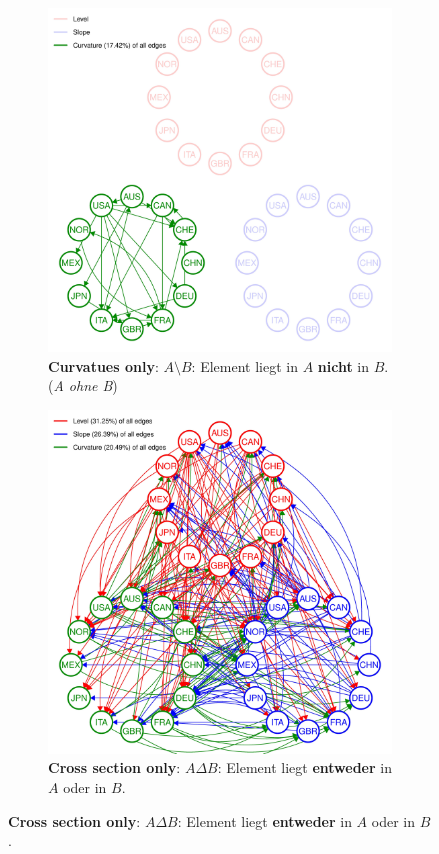 \documentclass{article}
\begin{document}
\begin{figure}[H]
  \medskip

  \begin{subfigure}[t]{.4\textwidth}
    \centering
    \includegraphics[width=\linewidth]{All_plot_onlycurv_2004-07-01_2019-12-31_0.01-page-001}
    \caption{\textbf{Curvatues only}: $A \setminus B$: Element liegt in $A$ \textbf{nicht} in $B$. (\textit{A ohne B})}
  \end{subfigure}
  \hfill
  \begin{subfigure}[t]{.4\textwidth}
    \centering
    \includegraphics[width=\linewidth]{All_plot_innerempty_2004-07-01_2019-12-31_0.01-page-001}
    \caption{\textbf{Cross section only}: $A \Delta B$: Element liegt \textbf{entweder} in $A$ oder in $B$.}
  \end{subfigure}
\end{figure}
\end{document}
